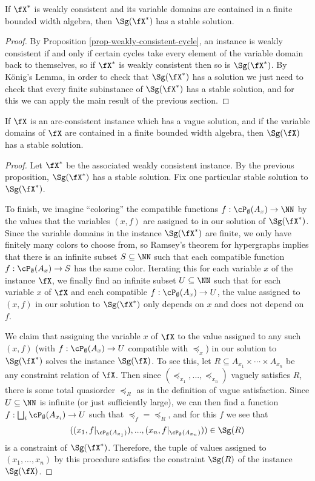 \begin{prop} If $\fX^*$ is weakly consistent and its variable domains are contained in a finite bounded width algebra, then $\Sg(\fX^*)$ has a stable solution.
\end{prop}
\begin{proof} By Proposition \ref{prop-weakly-consistent-cycle}, an instance is weakly consistent if and only if certain cycles take every element of the variable domain back to themselves, so if $\fX^*$ is weakly consistent then so is $\Sg(\fX^*)$. By K\"onig's Lemma, in order to check that $\Sg(\fX^*)$ has a solution we just need to check that every finite subinstance of $\Sg(\fX^*)$ has a stable solution, and for this we can apply the main result of the previous section.
\end{proof}

\begin{thm} If $\fX$ is an arc-consistent instance which has a vague solution, and if the variable domains of $\fX$ are contained in a finite bounded width algebra, then $\Sg(\fX)$ has a stable solution.
\end{thm}
\begin{proof} Let $\fX^*$ be the associated weakly consistent instance. By the previous proposition, $\Sg(\fX^*)$ has a stable solution. Fix one particular stable solution to $\Sg(\fX^*)$.

To finish, we imagine ``coloring'' the compatible functions $f : \cP_\emptyset(A_x) \rightarrow \NN$ by the values that the variables $(x,f)$ are assigned to in our solution of $\Sg(\fX^*)$. Since the variable domains in the instance $\Sg(\fX^*)$ are finite, we only have finitely many colors to choose from, so Ramsey's theorem for hypergraphs implies that there is an infinite subset $S \subseteq \NN$ such that each compatible function $f : \cP_\emptyset(A_x) \rightarrow S$ has the same color. Iterating this for each variable $x$ of the instance $\fX$, we finally find an infinite subset $U \subseteq \NN$ such that for each variable $x$ of $\fX$ and each compatible $f : \cP_\emptyset(A_x) \rightarrow U$, the value assigned to $(x,f)$ in our solution to $\Sg(\fX^*)$ only depends on $x$ and does not depend on $f$.

We claim that assigning the variable $x$ of $\fX$ to the value assigned to any such $(x,f)$ (with $f : \cP_\emptyset(A_x) \rightarrow U$ compatible with $\preceq_x$) in our solution to $\Sg(\fX^*)$ solves the instance $\Sg(\fX)$. To see this, let $R \subseteq A_{x_1} \times \cdots \times A_{x_n}$ be any constraint relation of $\fX$. Then since $(\preceq_{x_1}, ..., \preceq_{x_n})$ vaguely satisfies $R$, there is some total quasiorder $\preceq_R$ as in the definition of vague satisfaction. Since $U \subseteq \NN$ is infinite (or just sufficiently large), we can then find a function $f : \bigsqcup_i \cP_\emptyset(A_{x_i}) \rightarrow U$ such that $\preceq_f = \preceq_R$, and for this $f$ we see that
\[
((x_1,f|_{\cP_\emptyset(A_{x_1})}), ..., (x_n,f|_{\cP_\emptyset(A_{x_n})})) \in \Sg(R)
\]
is a constraint of $\Sg(\fX^*)$. Therefore, the tuple of values assigned to $(x_1, ..., x_n)$ by this procedure satisfies the constraint $\Sg(R)$ of the instance $\Sg(\fX)$.
\end{proof}

